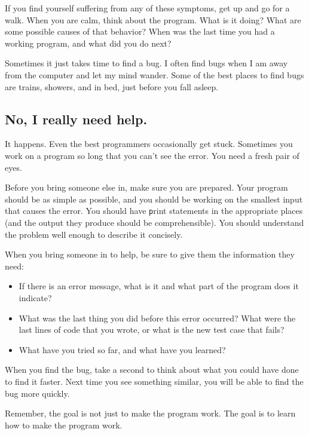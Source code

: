 \documentclass[
DIV=11,
fontsize=12,
twoside,
headinclude=false,
titlepage=firstiscover,
abstract=true,
headsepline=true,
footsepline=true,
chapterprefix=true, %
headings=big,
bibliography=totoc,%
captions=tableheading
]{scrbook}
\theoremstyle{definition}
\begin{document}
If you find yourself suffering from any of these symptoms, get
up and go for a walk.  When you are calm, think about the program.
What is it doing?  What are some possible causes of that
behavior?  When was the last time you had a working program,
and what did you do next?

Sometimes it just takes time to find a bug.  I often find bugs
when I am away from the computer and let my mind wander.  Some
of the best places to find bugs are trains, showers, and in bed,
just before you fall asleep.


\subsection{No, I really need help.}

It happens.  Even the best programmers occasionally get stuck.
Sometimes you work on a program so long that you can't see the
error.  You need a fresh pair of eyes.

Before you bring someone else in, make sure you are prepared.
Your program should be as simple
as possible, and you should be working on the smallest input
that causes the error.  You should have {\texttt print} statements in the
appropriate places (and the output they produce should be
comprehensible).  You should understand the problem well enough
to describe it concisely.

When you bring someone in to help, be sure to give
them the information they need:

\begin{itemize}

\item If there is an error message, what is it
and what part of the program does it indicate?

\item What was the last thing you did before this error occurred?
What were the last lines of code that you wrote, or what is
the new test case that fails?

\item What have you tried so far, and what have you learned?

\end{itemize}

When you find the bug, take a second to think about what you
could have done to find it faster.  Next time you see something
similar, you will be able to find the bug more quickly.

Remember, the goal is not just to make the program
work.  The goal is to learn how to make the program work.
\end{document}
